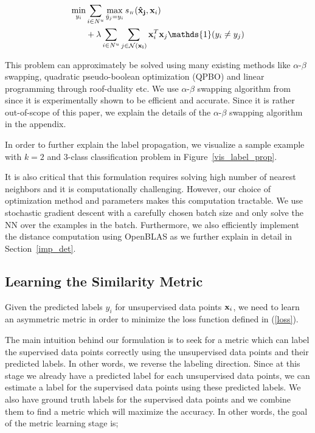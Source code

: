\begin{equation}
\begin{aligned}
\min_{y_i}  &\sum_{i \in N^u}  \max_{\hat{y}_j=y_i}  \sw(\mathbf{\hat{x}_j},\mathbf{x}_{i}) \\
&+ \lambda
\sum_{i \in N^u} \sum_{j \in \mathcal{N}(\mathbf{x_i})} \mathbf{x}_i^T \mathbf{x}_j\mathds{1}(y_i \neq y_j)
\end{aligned}
\label{robtran}
\end{equation}

This problem can approximately be solved using many existing methods like $\alpha$-$\beta$ swapping, quadratic pseudo-boolean optimization (QPBO) and linear programming through roof-duality etc. We use $\alpha$-$\beta$ swapping algorithm from \cite{kolmogrovalphabeta} since it is experimentally shown to be efficient and accurate. Since it is rather out-of-scope of this paper, we explain the details of the $\alpha$-$\beta$ swapping algorithm in the appendix.

In order to further explain the label propagation, we visualize a sample example with $k=2$ and $3$-class classification problem in Figure~\ref{vis_label_prop}. 

It is also critical that this formulation requires solving high number of nearest neighbors and it is computationally challenging. However, our choice of optimization method and parameters makes this computation tractable. We use stochastic gradient descent with a carefully chosen batch size and only solve the NN over the examples in the batch. Furthermore, we also efficiently implement the distance computation using OpenBLAS as we further explain in detail in Section~\ref{imp_det}. 


\subsection{Learning the Similarity Metric}
\label{metric}
Given the predicted labels $y_i$ for unsupervised data points $\mathbf{x}_i$, we need to learn an asymmetric metric in order to minimize the loss function defined in (\ref{loss}). 

The main intuition behind our formulation is to seek for a metric which can label the supervised data points correctly using the unsupervised data points and their predicted labels. In other words, we reverse the labeling direction. Since at this stage we already have a predicted label for each unsupervised data points, we can estimate a label for the supervised data points using these predicted labels. We also have ground truth labels for the supervised data points and we combine them to find a metric which will maximize the accuracy. In other words, the goal of the metric learning stage is;

